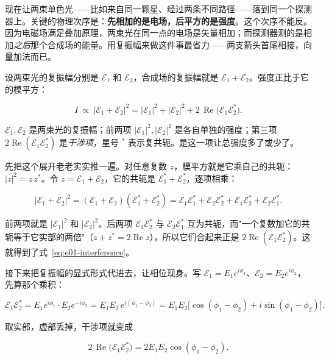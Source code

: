 现在让两束单色光——比如来自同一颗星、经过两条不同路径——落到同一个探测器上。关键的物理次序是：\textbf{先相加的是电场，后平方的是强度}。这个次序不能反。因为电磁场满足叠加原理，两束光在同一点的电场是矢量相加；而探测器测的是相加\emph{之后}那个合成场的能量。用复振幅来做这件事最省力——两支箭头首尾相接，向量加法而已。

设两束光的复振幅分别是 \(\mathcal E_1\) 和 \(\mathcal E_2\)，合成场的复振幅就是 \(\mathcal E_1+\mathcal E_2\)。强度正比于它的模平方：

\begin{equation}
  I\ \propto\ |\mathcal E_1+\mathcal E_2|^2
  =|\mathcal E_1|^2+|\mathcal E_2|^2+2\,\operatorname{Re}\!\bigl(\mathcal E_1\mathcal E_2^{\ast}\bigr).
  \label{eq:e01-interference}
\end{equation}
\begin{formulaexplain}
\(\mathcal E_1,\mathcal E_2\) 是两束光的复振幅；前两项 \(|\mathcal E_1|^2,|\mathcal E_2|^2\) 是各自单独的强度；第三项 \(2\operatorname{Re}(\mathcal E_1\mathcal E_2^{\ast})\) 是\emph{干涉项}，星号 \({}^\ast\) 表示复共轭。是这一项让总强度多了或少了。
\end{formulaexplain}

先把这个展开老老实实推一遍。对任意复数 \(z\)，模平方就是它乘自己的共轭：\(|z|^2=z\,z^{\ast}\)。令 \(z=\mathcal E_1+\mathcal E_2\)，它的共轭是 \(\mathcal E_1^{\ast}+\mathcal E_2^{\ast}\)，逐项相乘：

\[
  |\mathcal E_1+\mathcal E_2|^2
  =(\mathcal E_1+\mathcal E_2)(\mathcal E_1^{\ast}+\mathcal E_2^{\ast})
  =\mathcal E_1\mathcal E_1^{\ast}+\mathcal E_2\mathcal E_2^{\ast}
  +\mathcal E_1\mathcal E_2^{\ast}+\mathcal E_2\mathcal E_1^{\ast}.
\]

前两项就是 \(|\mathcal E_1|^2\) 和 \(|\mathcal E_2|^2\)。后两项 \(\mathcal E_1\mathcal E_2^{\ast}\) 与 \(\mathcal E_2\mathcal E_1^{\ast}\) 互为共轭，而"一个复数加它的共轭等于它实部的两倍"（\(z+z^{\ast}=2\operatorname{Re}z\)），所以它们合起来正是 \(2\operatorname{Re}(\mathcal E_1\mathcal E_2^{\ast})\)。这就得到了式~\eqref{eq:e01-interference}。

接下来把复振幅的显式形式代进去，让相位现身。写 \(\mathcal E_1=E_1e^{i\phi_1}\)、\(\mathcal E_2=E_2e^{i\phi_2}\)，先算那个乘积：

\[
  \mathcal E_1\mathcal E_2^{\ast}
  =E_1e^{i\phi_1}\cdot E_2e^{-i\phi_2}
  =E_1E_2\,e^{i(\phi_1-\phi_2)}
  =E_1E_2\bigl[\cos(\phi_1-\phi_2)+i\sin(\phi_1-\phi_2)\bigr].
\]

取实部，虚部丢掉，干涉项就变成

\[
  2\,\operatorname{Re}\!\bigl(\mathcal E_1\mathcal E_2^{\ast}\bigr)
  =2E_1E_2\cos(\phi_1-\phi_2).
\]

